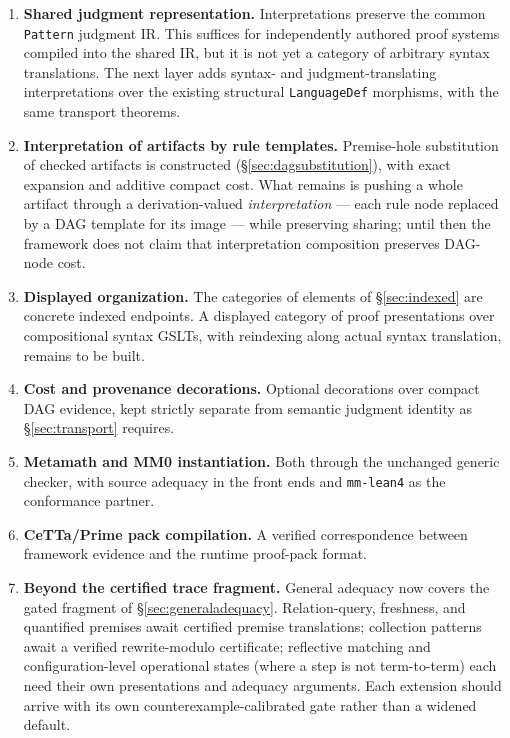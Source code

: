 \documentclass[]{article}
\theoremstyle{remark}
\newcommand{\code}[1]{\texttt{#1}}
\newcommand{\GSLT}{\textup{GSLT}}
\begin{document}
\begin{enumerate}
\item \textbf{Shared judgment representation.}  Interpretations preserve the
  common \code{Pattern} judgment IR.  This suffices for independently
  authored proof systems compiled into the shared IR, but it is not yet a
  category of arbitrary syntax translations.  The next layer adds syntax-
  and judgment-translating interpretations over the existing structural
  \code{LanguageDef} morphisms, with the same transport theorems.
\item \textbf{Interpretation of artifacts by rule templates.}  Premise-hole
  substitution of checked artifacts is constructed
  (\S\ref{sec:dagsubstitution}), with exact expansion and additive compact
  cost.  What remains is pushing a whole artifact through a
  derivation-valued \emph{interpretation} --- each rule node replaced by a
  DAG template for its image --- while preserving sharing; until then the
  framework does not claim that interpretation composition preserves
  DAG-node cost.
\item \textbf{Displayed organization.}  The categories of elements of
  \S\ref{sec:indexed} are concrete indexed endpoints.  A displayed category
  of proof presentations over compositional syntax \GSLT{}s, with reindexing
  along actual syntax translation, remains to be built.
\item \textbf{Cost and provenance decorations.}  Optional decorations over
  compact DAG evidence, kept strictly separate from semantic judgment
  identity as \S\ref{sec:transport} requires.
\item \textbf{Metamath and MM0 instantiation.}  Both through the unchanged
  generic checker, with source adequacy in the front ends and
  \code{mm-lean4} as the conformance partner.
\item \textbf{CeTTa/Prime pack compilation.}  A verified correspondence
  between framework evidence and the runtime proof-pack format.
\item \textbf{Beyond the certified trace fragment.}  General adequacy now
  covers the gated fragment of \S\ref{sec:generaladequacy}.  Relation-query,
  freshness, and quantified premises await certified premise translations;
  collection patterns await a verified rewrite-modulo certificate;
  reflective matching and configuration-level operational states (where a
  step is not term-to-term) each need their own presentations and adequacy
  arguments.  Each extension should arrive with its own
  counterexample-calibrated gate rather than a widened default.

\end{enumerate}
\end{document}
